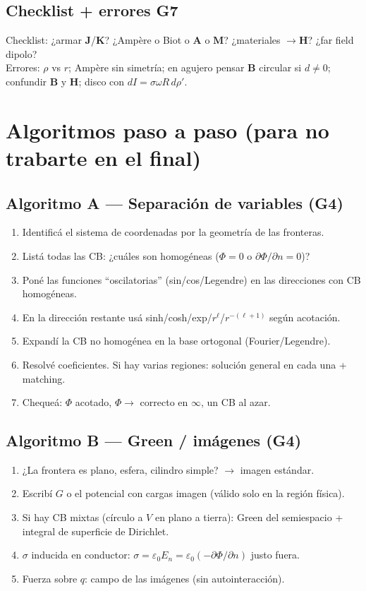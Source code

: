 \documentclass[10pt,a4paper]{article}
\newcommand{\vect}[1]{\mathbf{#1}}
\newcommand{\epso}{\varepsilon_0}
\begin{document}
\subsection{Checklist + errores G7}
Checklist: ¿armar $\vect{J}$/$\vect{K}$? ¿Ampère o Biot o $\vect{A}$ o $\vect{M}$? ¿materiales $\to\vect{H}$? ¿far field dipolo?\\
Errores: $\rho$ vs $r$; Ampère sin simetría; en agujero pensar $\vect{B}$ circular si $d\neq 0$; confundir $\vect{B}$ y $\vect{H}$; disco con $dI=\sigma\omega R\,d\rho'$.

\section{Algoritmos paso a paso (para no trabarte en el final)}

\subsection{Algoritmo A --- Separación de variables (G4)}
\begin{enumerate}
\item Identificá el sistema de coordenadas por la geometría de las fronteras.
\item Listá todas las CB: ¿cuáles son homogéneas ($\Phi=0$ o $\partial\Phi/\partial n=0$)?
\item Poné las funciones ``oscilatorias'' (sin/cos/Legendre) en las direcciones con CB homogéneas.
\item En la dirección restante usá sinh/cosh/exp/$r^\ell$/$r^{-(\ell+1)}$ según acotación.
\item Expandí la CB no homogénea en la base ortogonal (Fourier/Legendre).
\item Resolvé coeficientes. Si hay varias regiones: solución general en cada una + matching.
\item Chequeá: $\Phi$ acotado, $\Phi\to$ correcto en $\infty$, un CB al azar.
\end{enumerate}

\subsection{Algoritmo B --- Green / imágenes (G4)}
\begin{enumerate}
\item ¿La frontera es plano, esfera, cilindro simple? $\to$ imagen estándar.
\item Escribí $G$ o el potencial con cargas imagen (válido solo en la región física).
\item Si hay CB mixtas (círculo a $V$ en plano a tierra): Green del semiespacio + integral de superficie de Dirichlet.
\item $\sigma$ inducida en conductor: $\sigma=\epso E_n=\epso(-\partial\Phi/\partial n)$ justo fuera.
\item Fuerza sobre $q$: campo de las imágenes (sin autointeracción).
\end{enumerate}
\end{document}
